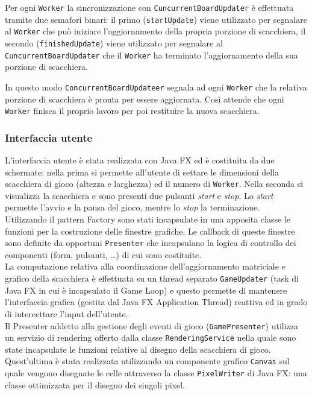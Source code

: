 ﻿\documentclass[a4paper]{article}
\begin{document}
Per ogni \texttt{Worker} la sincronizzazione con \texttt{CuncurrentBoardUpdater} è effettuata tramite due semafori binari: il primo (\texttt{startUpdate}) viene utilizzato per segnalare al \texttt{Worker} che può iniziare l'aggiornamento della propria porzione di scacchiera, il secondo (\texttt{finishedUpdate}) viene utilizzato per segnalare al \texttt{CuncurrentBoardUpdater} che il \texttt{Worker} ha terminato l'aggiornamento della sua porzione di scacchiera.

In questo modo \texttt{ConcurrentBoardUpdateer} segnala ad ogni \texttt{Worker} che la relativa porzione di scacchiera è pronta per essere aggiornata. Così attende che ogni \texttt{Worker} finisca il proprio lavoro per poi restituire la nuova scacchiera.

\subsubsection{Interfaccia utente}\label{interfaccia-utente}

L’interfaccia utente è stata realizzata con Java FX ed è costituita da due schermate: nella prima si permette all’utente di settare le dimensioni della scacchiera di gioco (altezza e larghezza) ed il numero di \texttt{Worker}. Nella seconda si visualizza la scacchiera e sono presenti due pulsanti \textit{start} e \textit{stop}. Lo \textit{start} permette l’avvio e la pausa del gioco, mentre lo \textit{stop} la terminazione.\\
Utilizzando il pattern Factory sono stati incapsulate in una apposita classe le funzioni per la costruzione delle finestre grafiche. Le callback di queste finestre sono definite da opportuni \texttt{Presenter} che incapsulano la logica di controllo dei componenti (form, pulsanti, …) di cui sono costituite.\\
La computazione relativa alla coordinazione dell’aggiornamento matriciale e grafico della scacchiera è effettuata su un thread separato \texttt{GameUpdater} (task di Java FX in cui è incapsulato il Game Loop) e questo permette di mantenere l’interfaccia grafica (gestita dal Java FX Application Thread) reattiva ed in grado di intercettare l’input dell’utente.\\
Il Presenter addetto alla gestione degli eventi di gioco (\texttt{GamePresenter}) utilizza un servizio di rendering offerto dalla  classe \texttt{RenderingService} nella quale sono state incapsulate le funzioni relative al disegno della scacchiera di gioco.
Quest'ultima è stata realizzata utilizzando un componente grafico \texttt{Canvas} sul quale vengono disegnate le celle attraverso la classe \texttt{PixelWriter} di Java FX: una classe ottimizzata per il disegno dei singoli pixel.
\end{document}
